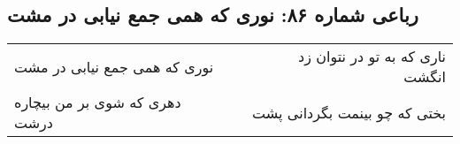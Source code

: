 \begin{center}
\section*{رباعی شماره ۸۶: نوری که همی جمع نیابی در مشت}
\label{sec:sh086}
\begin{longtable}{l p{0.5cm} r}
نوری که همی جمع نیابی در مشت
&&
ناری که به تو در نتوان زد انگشت
\\
دهری که شوی بر من بیچاره درشت
&&
بختی که چو بینمت بگردانی پشت
\\
\end{longtable}
\end{center}
